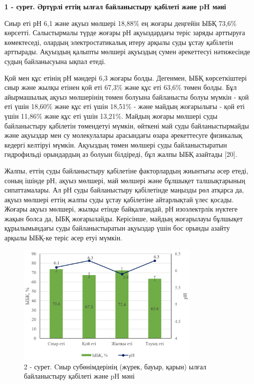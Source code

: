 {\bfseries 1 - сурет. Әртүрлі еттің ылғал байланыстыру қабілеті және pH
мәні}

\begin{multicols}{2}
Сиыр еті рН 6,1 және ақуыз мөлшері 18,88\% ең жоғары деңгейін ЫБҚ 73,6\%
көрсетті. Салыстырмалы түрде жоғары рН ақуыздардағы теріс заряды
арттыруға көмектеседі, олардың электростатикалық итеру арқылы суды ұстау
қабілетін арттырады. Ақуыздың қалыпты мөлшері ақуыздың сумен әрекеттесуі
нәтижесінде судың байланысуына ықпал етеді.

Қой мен құс етінің рН мәндері 6,3 жоғары болды. Дегенмен, ЫБҚ
көрсеткіштері сиыр және жылқы етінен қой еті 67,3\% және құс еті 63,6\%
төмен болды. Бұл айырмашылық ақуыз мөлшерінің төмен болуына байланысты
болуы мүмкін - қой еті үшін 18,60\% және құс еті үшін 18,51\% - және
майдың жоғарылығы - қой еті үшін 11,86\% және құс еті үшін 13,21\%.
Майдың жоғары мөлшері суды байланыстыру қабілетін төмендетуі мүмкін,
өйткені май суды байланыстырмайды және ақуыздар мен су молекулалары
арасындағы өзара әрекеттесуге физикалық кедергі келтіруі мүмкін.
Ақуыздың төмен мөлшері суды байланыстыратын гидрофильді орындардың аз
болуын білдіреді, бұл жалпы ЫБҚ азайтады {[}20{]}.

Жалпы, еттің суды байланыстыру қабілетіне факторлардың жиынтығы әсер
етеді, соның ішінде рН, ақуыз мөлшері, май мөлшері және бұлшықет
талшықтарының сипаттамалары. Ал рН суды байланыстыру қабілетінде маңызды
рөл атқарса да, ақуыз мөлшері еттің жалпы суды ұстау қабілетіне
айтарлықтай үлес қосады. Жоғары ақуыз мөлшері, жылқы етінде
байқалғандай, рН изоэлектрлік нүктеге жақын болса да, ЫБҚ жоғарылайды.
Керісінше, майдың жоғарылауы бұлшықет құрылымындағы суды байланыстыратын
ақуыздар үшін бос орынды азайту арқылы ЫБҚ-ке теріс әсер етуі мүмкін.
\end{multicols}


\begin{figure}[H]
	\centering
	\includegraphics[width=0.8\textwidth]{media/pish/image5}
	\caption*{2 - сурет. Cиыр субөнімдерінің (жүрек, бауыр, қарын) ылғал байланыстыру қабілеті және pH мәні}
\end{figure}

